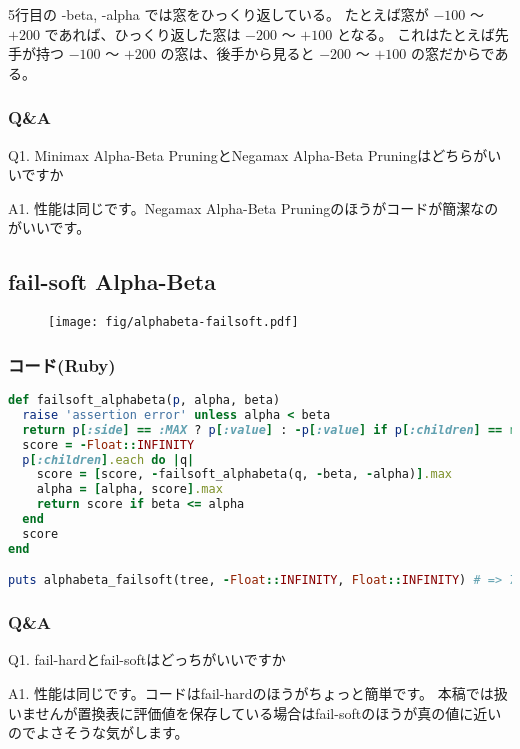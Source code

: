 \documentclass[11pt,a4paper]{ltjsarticle}
\begin{document}
5行目の -beta, -alpha では窓をひっくり返している。
たとえば窓が $-100$ 〜 $+200$ であれば、ひっくり返した窓は $-200$ 〜 $+100$ となる。
これはたとえば先手が持つ $-100$ 〜 $+200$ の窓は、後手から見ると $-200$ 〜 $+100$ の窓だからである。


\subsubsection{Q\&A}

Q1. Minimax Alpha-Beta PruningとNegamax Alpha-Beta Pruningはどちらがいいですか

A1. 性能は同じです。Negamax Alpha-Beta Pruningのほうがコードが簡潔なのがいいです。


\newpage

\subsection{fail-soft Alpha-Beta}
\label{failsoft}

\begin{figure}[h]
  \centering
  \texttt{[image: fig/alphabeta-failsoft.pdf]}
  \caption{}
  \label{alphabeta-failsoft}
\end{figure}


\subsubsection{コード(Ruby)}

\begin{lstlisting}[language=ruby,caption=failsoft-alphabeta.rb]
def failsoft_alphabeta(p, alpha, beta)
  raise 'assertion error' unless alpha < beta
  return p[:side] == :MAX ? p[:value] : -p[:value] if p[:children] == nil
  score = -Float::INFINITY
  p[:children].each do |q|
    score = [score, -failsoft_alphabeta(q, -beta, -alpha)].max
    alpha = [alpha, score].max
    return score if beta <= alpha
  end
  score
end

puts alphabeta_failsoft(tree, -Float::INFINITY, Float::INFINITY) # => 75
\end{lstlisting}


\subsubsection{Q\&A}

Q1. fail-hardとfail-softはどっちがいいですか

A1. 性能は同じです。コードはfail-hardのほうがちょっと簡単です。
本稿では扱いませんが置換表に評価値を保存している場合はfail-softのほうが真の値に近いのでよさそうな気がします\cite{journals/sigart/Fishburn83}。
\end{document}
